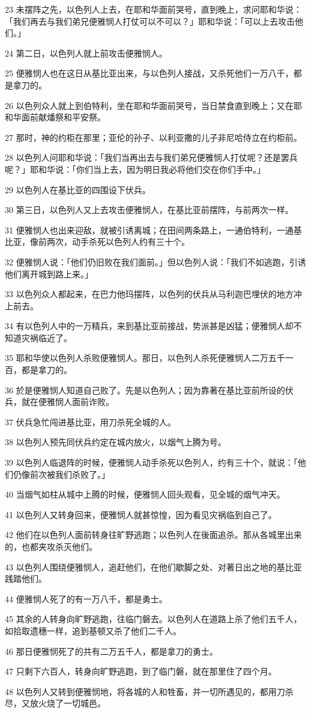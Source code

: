 \par 23 未摆阵之先，以色列人上去，在耶和华面前哭号，直到晚上，求问耶和华说：「我们再去与我们弟兄便雅悯人打仗可以不可以？」耶和华说：「可以上去攻击他们。」
\par 24 第二日，以色列人就上前攻击便雅悯人。
\par 25 便雅悯人也在这日从基比亚出来，与以色列人接战，又杀死他们一万八千，都是拿刀的。
\par 26 以色列众人就上到伯特利，坐在耶和华面前哭号，当日禁食直到晚上；又在耶和华面前献燔祭和平安祭。
\par 27 那时，神的约柜在那里；亚伦的孙子、以利亚撒的儿子非尼哈侍立在约柜前。
\par 28 以色列人问耶和华说：「我们当再出去与我们弟兄便雅悯人打仗呢？还是罢兵呢？」耶和华说：「你们当上去，因为明日我必将他们交在你们手中。」
\par 29 以色列人在基比亚的四围设下伏兵。
\par 30 第三日，以色列人又上去攻击便雅悯人，在基比亚前摆阵，与前两次一样。
\par 31 便雅悯人也出来迎敌，就被引诱离城；在田间两条路上，一通伯特利，一通基比亚，像前两次，动手杀死以色列人约有三十个。
\par 32 便雅悯人说：「他们仍旧败在我们面前。」但以色列人说：「我们不如逃跑，引诱他们离开城到路上来。」
\par 33 以色列众人都起来，在巴力他玛摆阵，以色列的伏兵从马利迦巴埋伏的地方冲上前去。
\par 34 有以色列人中的一万精兵，来到基比亚前接战，势派甚是凶猛；便雅悯人却不知道灾祸临近了。
\par 35 耶和华使以色列人杀败便雅悯人。那日，以色列人杀死便雅悯人二万五千一百，都是拿刀的。
\par 36 於是便雅悯人知道自己败了。先是以色列人；因为靠著在基比亚前所设的伏兵，就在便雅悯人面前诈败。
\par 37 伏兵急忙闯进基比亚，用刀杀死全城的人。
\par 38 以色列人预先同伏兵约定在城内放火，以烟气上腾为号。
\par 39 以色列人临退阵的时候，便雅悯人动手杀死以色列人，约有三十个，就说：「他们仍像前次被我们杀败了。」
\par 40 当烟气如柱从城中上腾的时候，便雅悯人回头观看，见全城的烟气冲天。
\par 41 以色列人又转身回来，便雅悯人就甚惊惶，因为看见灾祸临到自己了。
\par 42 他们在以色列人面前转身往旷野逃跑；以色列人在後面追杀。那从各城里出来的，也都夹攻杀灭他们。
\par 43 以色列人围绕便雅悯人，追赶他们，在他们歇脚之处、对著日出之地的基比亚践踏他们。
\par 44 便雅悯人死了的有一万八千，都是勇士。
\par 45 其余的人转身向旷野逃跑，往临门磐去。以色列人在道路上杀了他们五千人，如拾取遗穗一样，追到基顿又杀了他们二千人。
\par 46 那日便雅悯死了的共有二万五千人，都是拿刀的勇士。
\par 47 只剩下六百人，转身向旷野逃跑，到了临门磐，就在那里住了四个月。
\par 48 以色列人又转到便雅悯地，将各城的人和牲畜，并一切所遇见的，都用刀杀尽，又放火烧了一切城邑。

